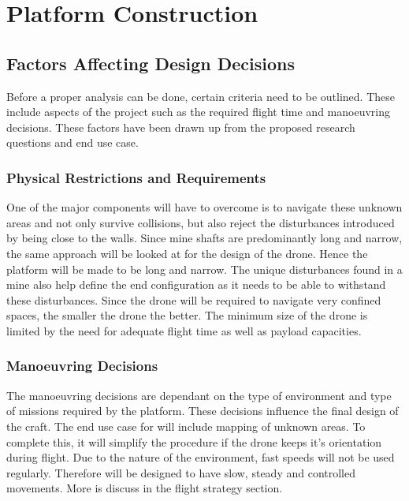 	\section{Platform Construction}			
		\subsection{Factors Affecting Design Decisions}
		Before a proper analysis can be done, certain criteria need to be outlined. These include aspects of the project such as the required flight time and manoeuvring decisions. These factors have been drawn up from the proposed research questions and end use case.
			\subsubsection{Physical Restrictions and Requirements}
			One of the major components \projectName will have to overcome is to navigate these unknown areas and not only survive collisions, but also reject the disturbances introduced by being close to the walls. Since mine shafts are predominantly long and narrow, the same approach will be looked at for the design of the drone. Hence the platform will be made to be long and narrow. The unique disturbances found in a mine also help define the end configuration as it needs to be able to withstand these disturbances.
			Since the drone will be required to navigate very confined spaces, the smaller the drone the better. The minimum size of the drone is limited by the need for adequate flight time as well as payload capacities.
			
			\subsubsection{Manoeuvring Decisions}
			The manoeuvring decisions are dependant on the type of environment and type of missions required by the platform. These decisions influence the final design of the craft.
			The end use case for \projectName will include mapping of unknown areas. To complete this, it will simplify the procedure if the drone keeps it's orientation during flight. Due to the nature of the environment, fast speeds will not be used regularly. Therefore \projectName will be designed to have slow, steady and controlled movements. More is discuss in the flight strategy section.
			
